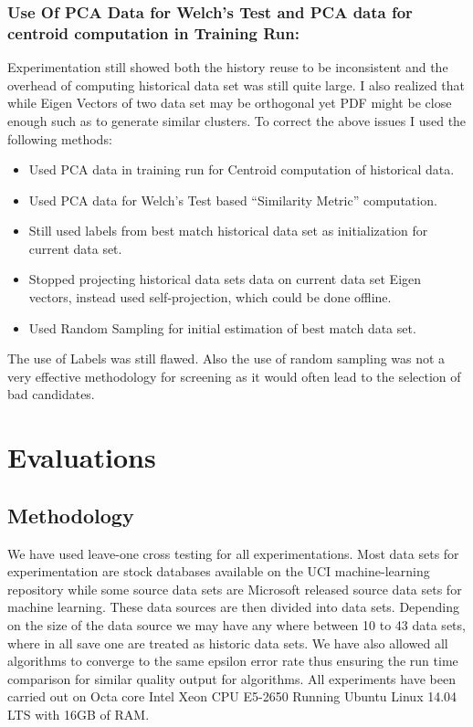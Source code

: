 \documentclass{vldb}
\begin{document}
\subsubsection{Use Of PCA Data for Welch’s Test and PCA data for centroid computation in Training Run:}
Experimentation still showed both the history reuse to be inconsistent and the overhead of computing historical data set was still quite large. I also realized that while Eigen Vectors of two data set may be orthogonal yet PDF might be close enough such as to generate similar clusters. To correct the above issues I used the following methods:
\begin{itemize}
    \item Used PCA data in training run for Centroid computation of historical data.
    \item Used PCA data for Welch’s Test based “Similarity Metric” computation.
    \item Still used labels from best match historical data set as initialization for current data set.
    \item Stopped projecting historical data sets data on current data set Eigen vectors, instead used self-projection, which could be done offline.
    \item Used Random Sampling for initial estimation of best match data set.
\end{itemize}
The use of Labels was still flawed. Also the use of random sampling was not a very effective methodology for screening as it would often lead to the selection of bad candidates.

\section{Evaluations}
\label{chap-five}

\subsection{Methodology}
We have used leave-one cross testing for all experimentations. Most data sets for experimentation are stock databases available on the UCI machine-learning repository while some source data sets are Microsoft released source data sets for machine learning.
These data sources are then divided into data sets. Depending on the size of the data source\cite{uci_machine_repo} we may have any where between 10 to 43 data sets, where in all save one are treated as historic data sets. We have also allowed all algorithms to converge to the same epsilon error rate thus ensuring the run time comparison for similar quality output for algorithms.
All experiments have been carried out on Octa core Intel Xeon CPU E5-2650 Running Ubuntu Linux 14.04 LTS with 16GB of RAM.
\end{document}
